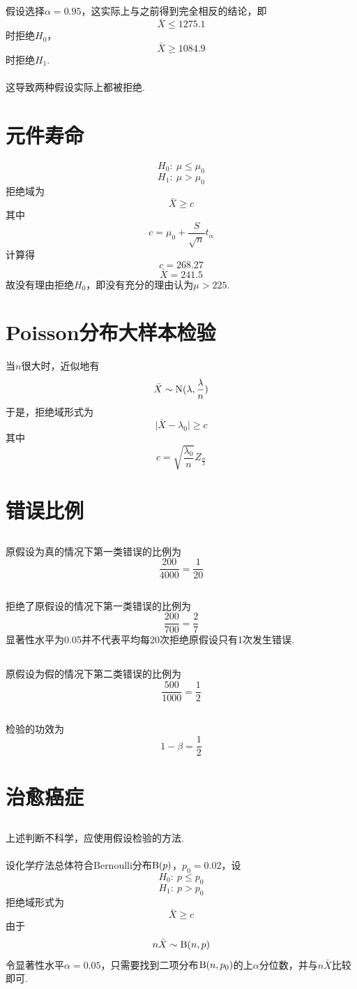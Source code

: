 \documentclass{article}
\begin{document}
\begin{CJK}{UTF8}{gbsn}
\subsection{}
假设选择$\alpha = 0.95$，这实际上与之前得到完全相反的结论，即
$$ \bar{X}\leq 1275.1 $$时拒绝$H_{0}$，
$$ \bar{X}\geq 1084.9 $$时拒绝$H_{1}$.
\\\\
这导致两种假设实际上都被拒绝.
\section{元件寿命}
$$ H_{0}:\ \mu\leq\mu_{0}$$
$$ H_{1}:\ \mu>\mu_{0}$$
拒绝域为
$$ \bar{X}\geq c$$
其中
$$ c = \mu_{0}+\frac{S}{\sqrt{n}}t_{\alpha}$$
计算得
$$ c = 268.27$$
$$ \bar{X}=241.5 $$
故没有理由拒绝$H_{0}$，即没有充分的理由认为$\mu>225$.
\section{Poisson分布大样本检验}
当$n$很大时，近似地有
$$ \bar{X}\sim{\rm N}(\lambda,\frac{\lambda}{n})$$
于是，拒绝域形式为
$$ \vert\bar{X}-\lambda_{0}\vert\geq c$$
其中
$$ c = \sqrt{\frac{\lambda_{0}}{n}}Z_{\frac{\alpha}{2}}$$
\section{错误比例}
\subsection{}
原假设为真的情况下第一类错误的比例为
$$\frac{200}{4000}=\frac{1}{20}$$
\subsection{}
拒绝了原假设的情况下第一类错误的比例为
$$\frac{200}{700}=\frac{2}{7}$$
显著性水平为0.05并不代表平均每20次拒绝原假设只有1次发生错误.
\subsection{}
原假设为假的情况下第二类错误的比例为
$$\frac{500}{1000}=\frac{1}{2}$$
\subsection{}
检验的功效为
$$ 1-\beta = \frac{1}{2}$$
\section{治愈癌症}
\subsection{}
上述判断不科学，应使用假设检验的方法.
\\\\设化学疗法总体符合Bernoulli分布${\rm B}(p)$，$p_{0}=0.02$，设
$$ H_{0}:\ p \leq p_{0}$$
$$ H_{1}:\ p > p_{0}$$
拒绝域形式为
$$ \bar{X}\geq c $$
由于
$$ n\bar{X}\sim{\rm B}(n,p)$$
令显著性水平$\alpha=0.05$，只需要找到二项分布${\rm B}(n,p_{0})$的上$\alpha$分位数，并与$n\bar{X}$比较即可.

\end{CJK}
\end{document}
